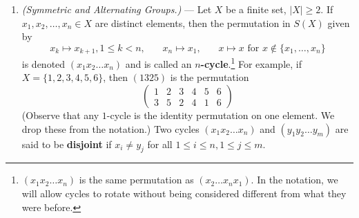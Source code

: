 \documentclass[leqno]{book}
\begin{document}
\begin{enumerate}
(b) If $Q$ is a Sylow $p$-subgroup, $|x|=p^k$ and $xQx^{-1}=Q$, then $x\in Q$. [The hypothesis $xQx^{-1}=Q$ states that $x\in N(Q)$, where $N(Q)$ is the normalizer of $Q$.  Since $Q$ is a normal subgroup of $N(Q)$, $N(Q)/Q$ is a well-defined group.  Explain why $p\nmid|N(Q)/Q|$ and the order of $xQ\in N(Q)/Q$ is a power of $p$; then use Lagrange's Theorem.]

(c) Any two Sylow $p$-subgroups of $G$ are conjugate.  [If $P$ and $Q$ are Sylow $p$-subgroups, then let $G$ act on the set $X$ of conjugates of $Q$ by conjugation.  Then the Orbit-Stabilizer Theorem implies that $|X|=[G:\operatorname{Stab}(Q)]\mid[G:\operatorname{Stab}(Q)][\operatorname{Stab}(Q):Q]=[G:Q]=m$.  Therefore $p$ does not divide $|X|$.  If $P$ acts on $X$ by conjugation, then Exercise 7 implies that the action has at least one fixed point.  Now use part (b) to show that the fixed point is equal to $P$.]

(d) The number of Sylow $p$-subgroups divides $|G|$ and is $\equiv 1\pmod p$.  [By part (a) there exists a Sylow $p$-subgroup $P$.  Now, if $X$ is the set of conjugates of $P$, then by part (c) $X$ is the set of all Sylow $p$-subgroups.  If $G$ acts on $X$ by conjugation, then $|X|=[G:\operatorname{Stab}(P)]$ by the Orbit-Stabilizer Theorem, hence $|X|$ divides $|G|$.  Moreover, if $P$ acts on $X$ by conjugation, part (b) shows that the only fixed point of the action is $P$; now use Exercise 7.]

\item\emph{(Symmetric and Alternating Groups.)} \---- Let $X$ be a finite set, $|X|\geqslant 2$.  If $x_1,x_2,\dots,x_n\in X$ are distinct elements, then the permutation in $S(X)$ given by
$$x_k\mapsto x_{k+1},1\leqslant k<n,~~~~~~~~x_n\mapsto x_1,~~~~~~~~x\mapsto x\text{ for }x\notin\{x_1,\dots,x_n\}$$
is denoted $(x_1x_2\dots x_n)$ and is called an \textbf{$n$-cycle}.\footnote{$(x_1x_2\dots x_n)$ is the same permutation as $(x_2\dots x_nx_1)$.  In the notation, we will allow cycles to rotate without being considered different from what they were before.}  For example, if $X=\{1,2,3,4,5,6\}$, then $(1325)$ is the permutation
$$\begin{pmatrix}1&2&3&4&5&6\\3&5&2&4&1&6\end{pmatrix}$$
(Observe that any $1$-cycle is the identity permutation on one element.  We drop these from the notation.)  Two cycles $(x_1x_2\dots x_n)$ and $(y_1y_2\dots y_m)$ are said to be \textbf{disjoint} if $x_i\ne y_j$ for all $1\le i\le n,1\le j\le m$.


\end{enumerate}
\end{document}
